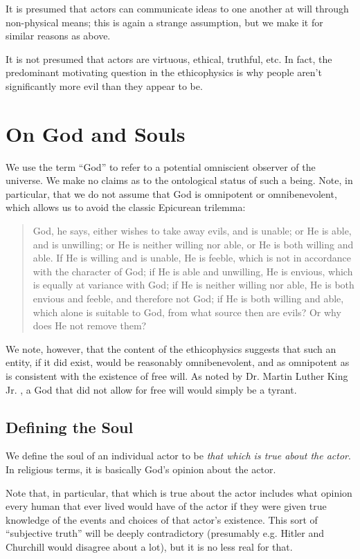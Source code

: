 \documentclass{article}
\begin{document}
It is presumed that actors can communicate ideas to one another at
will through non-physical means; this is again a strange assumption,
but we make it for similar reasons as above.

It is not presumed that actors are virtuous, ethical, truthful,
etc. In fact, the predominant motivating question in the ethicophysics
is why people aren't significantly more evil than they appear to be.

\section{On God and Souls}

We use the term ``God'' to refer to a potential omniscient observer of
the universe. We make no claims as to the ontological status of such a
being. Note, in particular, that we do not assume that God is
omnipotent or omnibenevolent, which allows us to avoid the classic
Epicurean trilemma:

\begin{quote}
  God, he says, either wishes to take away evils, and is unable; or He
  is able, and is unwilling; or He is neither willing nor able, or He
  is both willing and able. If He is willing and is unable, He is
  feeble, which is not in accordance with the character of God; if He
  is able and unwilling, He is envious, which is equally at variance
  with God; if He is neither willing nor able, He is both envious and
  feeble, and therefore not God; if He is both willing and able, which
  alone is suitable to God, from what source then are evils? Or why
  does He not remove them?\cite{trilemma}
\end{quote}

We note, however, that the content of the ethicophysics suggests that
such an entity, if it did exist, would be reasonably omnibenevolent,
and as omnipotent as is consistent with the existence of free will.
As noted by Dr. Martin Luther King Jr. \cite{king1963tough}, a God that
did not allow for free will would simply be a tyrant.

\subsection{Defining the Soul}

We define the soul of an individual actor to be {\em that which is
  true about the actor}. In religious terms, it is basically God's
opinion about the actor.

Note that, in particular, that which is true about the actor includes
what opinion every human that ever lived would have of the actor if
they were given true knowledge of the events and choices of that
actor's existence. This sort of ``subjective truth'' will be deeply
contradictory (presumably e.g. Hitler and Churchill would disagree
about a lot), but it is no less real for that.
\end{document}
